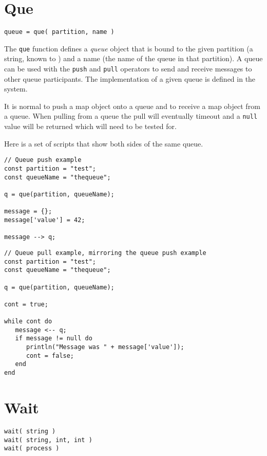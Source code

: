 \section{Que}

\begin{Verbatim}
queue = que( partition, name )
\end{Verbatim}

The \Verb+que+ function defines a \emph{queue} object that is bound to the given partition (a string, known to \Rapture) and a name (the name of the queue in that partition). A queue can be used with the \verb+push+ and \verb+pull+ operators to send and receive messages to other queue participants. The implementation of a given queue is defined in the \Rapture system.

It is normal to push a map object onto a queue and to receive a map object from a queue. When pulling from a queue the pull will eventually timeout and a \Verb+null+ value will be returned which will need to be tested for.

Here is a set of scripts that show both sides of the same queue.

\begin{lstlisting}[caption={Queue push example}]
// Queue push example
const partition = "test";
const queueName = "thequeue";

q = que(partition, queueName);

message = {};
message['value'] = 42;

message --> q;

\end{lstlisting}

\begin{lstlisting}[caption={Queue pull example}]
// Queue pull example, mirroring the queue push example
const partition = "test";
const queueName = "thequeue";

q = que(partition, queueName);

cont = true;

while cont do
   message <-- q;
   if message != null do
      println("Message was " + message['value']);
      cont = false;
   end
end

\end{lstlisting}

\section{Wait}

\begin{Verbatim}
wait( string )
wait( string, int, int )
wait( process )
\end{Verbatim}

